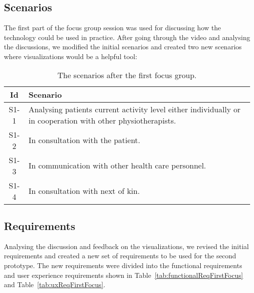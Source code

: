 \subsection{Scenarios}
The first part of the focus group session was used for discussing how the technology could be used in practice. After going through the video and analysing the discussions, we modified the initial scenarios and created two new scenarios where visualizations would be a helpful tool: 
\begin{table}[!h]
  \centering
  \begin{tabular}{|c|p{10cm}|}
    \hline
    \textbf{Id} & \textbf{Scenario} \\ \hline
    S1-1 & Analysing patients current activity level either individually or in cooperation with other physiotherapists. \\ \hline
    S1-2 & In consultation with the patient. \\ \hline
    S1-3 & In communication with other health care personnel. \\ \hline
    S1-4 & In consultation with next of kin. \\ \hline
  \end{tabular}
  \caption[Scenarios after Focus Group 1]{The scenarios after the first focus group.}
\end{table}

\subsection{Requirements}
Analysing the discussion and feedback on the visualizations, we revised the initial requirements and created a new set of requirements to be used for the second prototype. The new requirements were divided into the functional requirements and user experience requirements shown in Table~\ref{tab:functionalReqFirstFocus} and Table~\ref{tab:uxReqFirstFocus}. 


